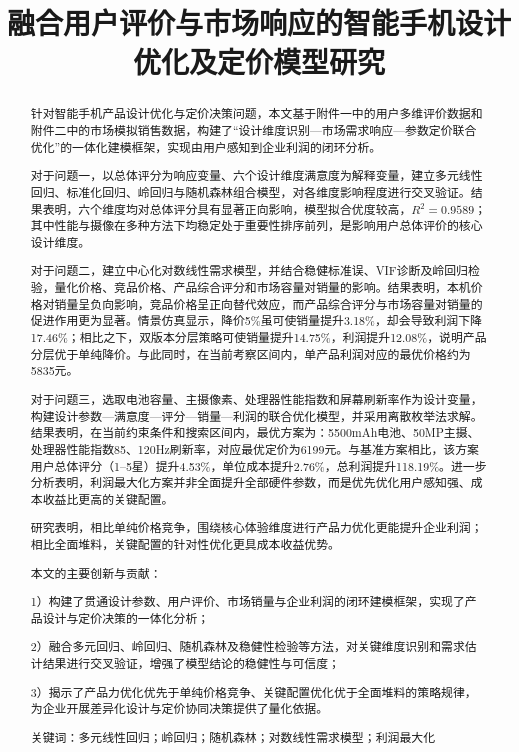 \documentclass[withoutpreface,bwprint]{cumcmthesis} %
\title{融合用户评价与市场响应的智能手机设计优化及定价模型研究}  %
\begin{document}
\maketitle
\begin{abstract}
针对\heiti 智能手机产品设计优化与定价决策问题\songti，本文基于附件一中的\heiti 用户多维评价数据\songti 和附件二中的\heiti 市场模拟销售数据\songti，构建了“\heiti 设计维度识别—市场需求响应—参数定价联合优化\songti”的一体化建模框架，实现由\heiti 用户感知\songti 到\heiti 企业利润\songti 的闭环分析。

对于问题一，以\heiti 总体评分\songti 为响应变量、\heiti 六个设计维度满意度\songti 为解释变量，建立\heiti 多元线性回归、标准化回归、岭回归与随机森林组合模型\songti，对各维度影响程度进行交叉验证。结果表明，六个维度均对总体评分具有\heiti 显著正向影响\songti，模型拟合优度较高，$R^2=0.9589$；其中\heiti 性能\songti 与\heiti 摄像\songti 在多种方法下均稳定处于重要性排序前列，是影响用户总体评价的\heiti 核心设计维度\songti。

对于问题二，建立\heiti 中心化对数线性需求模型\songti，并结合\heiti 稳健标准误、VIF诊断及岭回归检验\songti，量化价格、竞品价格、产品综合评分和市场容量对销量的影响。结果表明，本机价格对销量呈\heiti 负向影响\songti，竞品价格呈\heiti 正向替代效应\songti，而\heiti 产品综合评分\songti 与\heiti 市场容量\songti 对销量的促进作用更为显著。情景仿真显示，降价5\%虽可使销量提升3.18\%，却会导致利润下降17.46\%；相比之下，\heiti 双版本分层策略\songti 可使销量提升14.75\%，利润提升12.08\%，说明\heiti 产品分层优于单纯降价\songti。与此同时，在当前考察区间内，单产品利润对应的\heiti 最优价格\songti 约为5835元。

对于问题三，选取\heiti 电池容量、主摄像素、处理器性能指数和屏幕刷新率\songti 作为设计变量，构建\heiti 设计参数—满意度—评分—销量—利润\songti 的联合优化模型，并采用\heiti 离散枚举法\songti 求解。结果表明，在当前约束条件和搜索区间内，最优方案为：5500mAh电池、50MP主摄、处理器性能指数85、120Hz刷新率，对应最优定价为6199元。与基准方案相比，该方案\heiti 用户总体评分（1--5星）提升4.53\%\songti，\heiti 单位成本提升2.76\%\songti，\heiti 总利润提升118.19\%\songti。进一步分析表明，\heiti 利润最大化方案并非全面提升全部硬件参数，而是优先优化用户感知强、成本收益比更高的关键配置\songti。

研究表明，\heiti 相比单纯价格竞争，围绕核心体验维度进行产品力优化更能提升企业利润；相比全面堆料，关键配置的针对性优化更具成本收益优势\songti。

\begin{highlightbox}
{\heiti 本文的主要创新与贡献：}

1）构建了贯通\heiti 设计参数、用户评价、市场销量与企业利润\songti 的闭环建模框架，实现了产品设计与定价决策的一体化分析；

2）融合\heiti 多元回归、岭回归、随机森林及稳健性检验\songti 等方法，对关键维度识别和需求估计结果进行交叉验证，增强了模型结论的稳健性与可信度；

3）揭示了\heiti 产品力优化优先于单纯价格竞争、关键配置优化优于全面堆料\songti 的策略规律，为企业开展差异化设计与定价协同决策提供了量化依据。
\end{highlightbox}

{\heiti 关键词：}多元线性回归；岭回归；随机森林；对数线性需求模型；利润最大化
\end{abstract}
\end{document}

